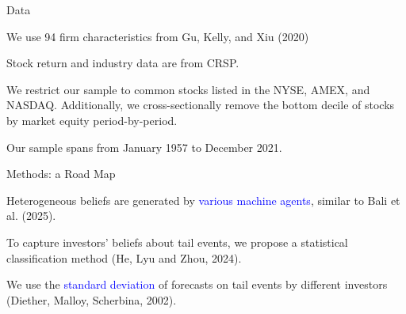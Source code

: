 \documentclass[11pt, aspectratio=169]{beamer}
\newenvironment{wideitemize}{\itemize\addtolength{\itemsep}{10pt}}{\enditemize}
\begin{document}
\begin{frame}{Data}
    \bigskip
    \begin{wideitemize}
    \item We use 94 firm characteristics from Gu, Kelly, and Xiu (2020) %
    \item Stock return and industry data are from CRSP.
    \item We restrict our sample to common stocks listed in the NYSE, AMEX, and NASDAQ. Additionally, we cross-sectionally remove the bottom decile of stocks by market equity period-by-period.
    \item Our sample spans from January 1957 to December 2021.
    \end{wideitemize}
\end{frame}


\begin{frame}{Methods: a Road Map}
    \bigskip
    \begin{wideitemize}
    \item Heterogeneous beliefs are generated by \textcolor{blue}{various machine agents}, similar to Bali et al. (2025).
    
    \item To capture investors' beliefs about tail events, we propose a statistical \alert{classification} method (He, Lyu and Zhou, 2024).

    \item We use the \textcolor{blue}{standard deviation} of forecasts on tail events by different investors (Diether, Malloy, Scherbina, 2002).
    \end{wideitemize}
\end{frame}

\end{document}
